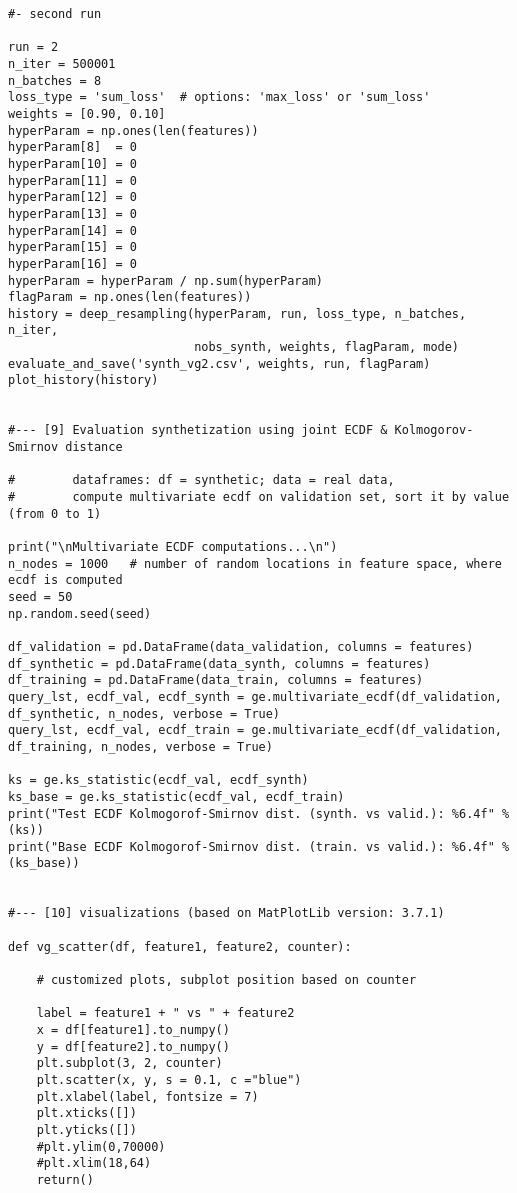 \documentclass[oneside,10pt]{book}
\begin{document}
\begin{lstlisting}
#- second run

run = 2
n_iter = 500001
n_batches = 8
loss_type = 'sum_loss'  # options: 'max_loss' or 'sum_loss' 
weights = [0.90, 0.10]  
hyperParam = np.ones(len(features))
hyperParam[8]  = 0
hyperParam[10] = 0
hyperParam[11] = 0
hyperParam[12] = 0
hyperParam[13] = 0
hyperParam[14] = 0
hyperParam[15] = 0
hyperParam[16] = 0
hyperParam = hyperParam / np.sum(hyperParam)
flagParam = np.ones(len(features))   
history = deep_resampling(hyperParam, run, loss_type, n_batches, n_iter, 
                          nobs_synth, weights, flagParam, mode)
evaluate_and_save('synth_vg2.csv', weights, run, flagParam)
plot_history(history)


#--- [9] Evaluation synthetization using joint ECDF & Kolmogorov-Smirnov distance

#        dataframes: df = synthetic; data = real data,
#        compute multivariate ecdf on validation set, sort it by value (from 0 to 1) 

print("\nMultivariate ECDF computations...\n")
n_nodes = 1000   # number of random locations in feature space, where ecdf is computed
seed = 50
np.random.seed(seed) 

df_validation = pd.DataFrame(data_validation, columns = features)
df_synthetic = pd.DataFrame(data_synth, columns = features)
df_training = pd.DataFrame(data_train, columns = features) 
query_lst, ecdf_val, ecdf_synth = ge.multivariate_ecdf(df_validation, df_synthetic, n_nodes, verbose = True) 
query_lst, ecdf_val, ecdf_train = ge.multivariate_ecdf(df_validation, df_training, n_nodes, verbose = True) 

ks = ge.ks_statistic(ecdf_val, ecdf_synth)
ks_base = ge.ks_statistic(ecdf_val, ecdf_train)
print("Test ECDF Kolmogorof-Smirnov dist. (synth. vs valid.): %6.4f" %(ks))
print("Base ECDF Kolmogorof-Smirnov dist. (train. vs valid.): %6.4f" %(ks_base))


#--- [10] visualizations (based on MatPlotLib version: 3.7.1)

def vg_scatter(df, feature1, feature2, counter):

    # customized plots, subplot position based on counter

    label = feature1 + " vs " + feature2
    x = df[feature1].to_numpy()
    y = df[feature2].to_numpy()
    plt.subplot(3, 2, counter)
    plt.scatter(x, y, s = 0.1, c ="blue")
    plt.xlabel(label, fontsize = 7)
    plt.xticks([])
    plt.yticks([])
    #plt.ylim(0,70000)
    #plt.xlim(18,64)
    return()


\end{lstlisting}
\end{document}
